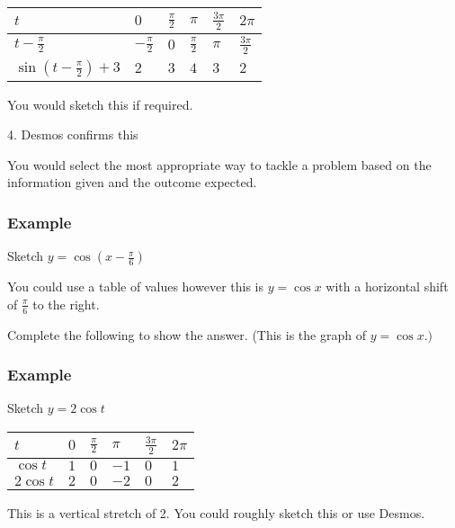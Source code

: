 \begin{tabular}[c]{|l|l|l|l|l|l|}\hline
	$t$  & $0$  & $\frac{\pi }{2}$  & $\pi $  & $\frac{3 \pi }{2}$  & $2 \pi $  \\
	\hline
	$t -\frac{\pi }{2}$  & $ -\frac{\pi }{2}$  & $0$  & $\frac{\pi }{2}$  & $\pi $  & $\frac{3 \pi }{2}$  \\
	\hline
	$\sin  \left (t -\frac{\pi }{2}\right ) +3$  & $2$  & $3$  & $4$  & $3$  & $2$  \\
	\hline
\end{tabular}

You would sketch this if required. 

4. Desmos confirms this 


\setlength\fboxrule{0.01in}\setlength\fboxsep{0.2in}


You would select the most appropriate way to tackle a problem based on the information given and the outcome expected. 

\subsubsection{Example}
Sketch $y =\cos  (x -\frac{\pi }{6})$ 

You could use a table of values however this is $y =\cos  x$ with a horizontal shift of $\frac{\pi }{6}$ to the right. 

Complete the following to show the answer. (This is the graph of $y =\cos  x .)$ 


\setlength\fboxrule{0.01in}\setlength\fboxsep{0.2in}


\subsubsection{Example}
Sketch $y =2 \cos  t$ 


\begin{tabular}[c]{|l|l|l|l|l|l|}\hline
	$t$  & $0$  & $\frac{\pi }{2}$  & $\pi $  & $\frac{3 \pi }{2}$  & $2 \pi $  \\
	\hline
	$\cos  t$  & $1$  & $0$  & $ -1$  & $0$  & $1$  \\
	\hline
	$2 \cos  t$  & $2$  & $0$  & $ -2$  & $0$  & $2$  \\
	\hline
\end{tabular}

This is a vertical stretch of 2. You could roughly sketch this or use Desmos. 


